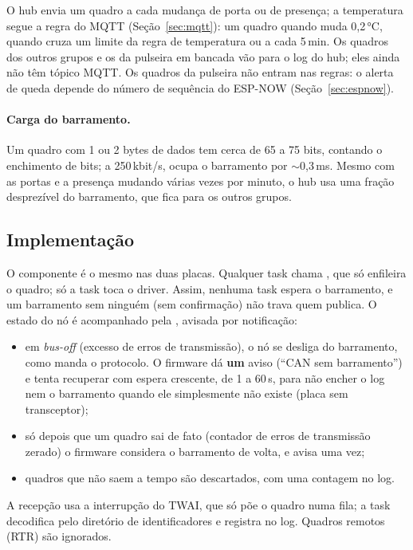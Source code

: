 O hub envia um quadro a cada mudança de porta ou de presença; a temperatura segue a regra do
MQTT (Seção~\ref{sec:mqtt}): um quadro quando muda 0,2\,°C, quando cruza um limite da regra
de temperatura ou a cada 5\,min. Os quadros dos outros grupos e os da pulseira em bancada vão para o log do hub; eles
ainda não têm tópico MQTT. Os quadros da pulseira não entram nas regras: o alerta de queda
depende do número de sequência do ESP-NOW (Seção~\ref{sec:espnow}).

\paragraph{Carga do barramento.} Um quadro com 1 ou 2 bytes de dados tem cerca de 65 a 75 bits,
contando o enchimento de bits; a 250\,kbit/s, ocupa o barramento por $\sim$0,3\,ms. Mesmo com
as portas e a presença mudando várias vezes por minuto, o hub usa uma fração desprezível do
barramento, que fica para os outros grupos.

\subsection{Implementação}

O componente  é o mesmo nas duas placas. Qualquer task chama
, que só enfileira o quadro; só a task  toca o driver.
Assim, nenhuma task espera o barramento, e um barramento sem ninguém (sem confirmação) não
trava quem publica. O estado do nó é acompanhado pela , avisada por notificação:
\begin{itemize}
  \item em \textit{bus-off} (excesso de erros de transmissão), o nó se desliga do barramento,
        como manda o protocolo. O firmware dá \textbf{um} aviso (``CAN sem barramento'') e tenta
        recuperar com espera crescente, de 1 a 60\,s, para não encher o log nem o barramento
        quando ele simplesmente não existe (placa sem transceptor);
  \item só depois que um quadro sai de fato (contador de erros de transmissão zerado) o
        firmware considera o barramento de volta, e avisa uma vez;
  \item quadros que não saem a tempo são descartados, com uma contagem no log.
\end{itemize}

A recepção usa a interrupção do TWAI, que só põe o quadro numa fila; a task 
decodifica pelo diretório de identificadores e registra no log. Quadros remotos (RTR) são
ignorados.

